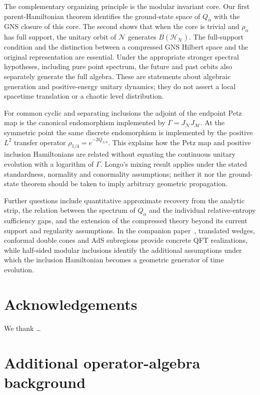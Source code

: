 \documentclass[a4paper,11pt]{article}
\theoremstyle{definition}
\newcommand{\mN}{\mathcal{N}}
\newcommand{\mH}{\mathcal{H}}
\newcommand{\mM}{\mathcal{M}}
\begin{document}
The complementary organizing principle is the modular invariant core. Our first parent-Hamiltonian theorem identifies the ground-state space of $Q_\alpha$ with the GNS closure of this core. The second shows that when the core is trivial and $\rho_\alpha$ has full support, the unitary orbit of $\mN$ generates $B(\mH_{\mN})$. The full-support condition and the distinction between a compressed GNS Hilbert space and the original representation are essential. Under the appropriate stronger spectral hypotheses, including pure point spectrum, the future and past orbits also separately generate the full algebra. These are statements about algebraic generation and positive-energy unitary dynamics; they do not assert a local spacetime translation or a chaotic level distribution.

For common cyclic and separating inclusions the adjoint of the endpoint Petz map is the canonical endomorphism implemented by $\Gamma=J_{\mN}J_{\mM}$. At the symmetric point the same discrete endomorphism is implemented by the positive $L^2$ transfer operator $\rho_{1/4}=e^{-2Q_{1/4}}$. This explains how the Petz map and positive inclusion Hamiltonians are related without equating the continuous unitary evolution with a logarithm of $\Gamma$. Longo's mixing result applies under the stated standardness, normality and conormality assumptions; neither it nor the ground-state theorem should be taken to imply arbitrary geometric propagation.

Further questions include quantitative approximate recovery from the analytic strip, the relation between the spectrum of $Q_\alpha$ and the individual relative-entropy sufficiency gaps, and the extension of the compressed theory beyond its current support and regularity assumptions. In the companion paper~\cite{companionQFT}, translated wedges, conformal double cones and AdS subregions provide concrete QFT realizations, while half-sided modular inclusions identify the additional assumptions under which the inclusion Hamiltonian becomes a geometric generator of time evolution.

\section*{Acknowledgements}
We thank \ldots

\appendix

\section{Additional operator-algebra background}\label{app:extra-operator-algebra}
\end{document}
